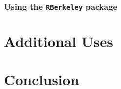 \documentclass[]{article}
\begin{document}
\subsubsection{Using the \texttt{RBerkeley} package}

\section{Additional Uses}


\section{Conclusion}



\end{document}
